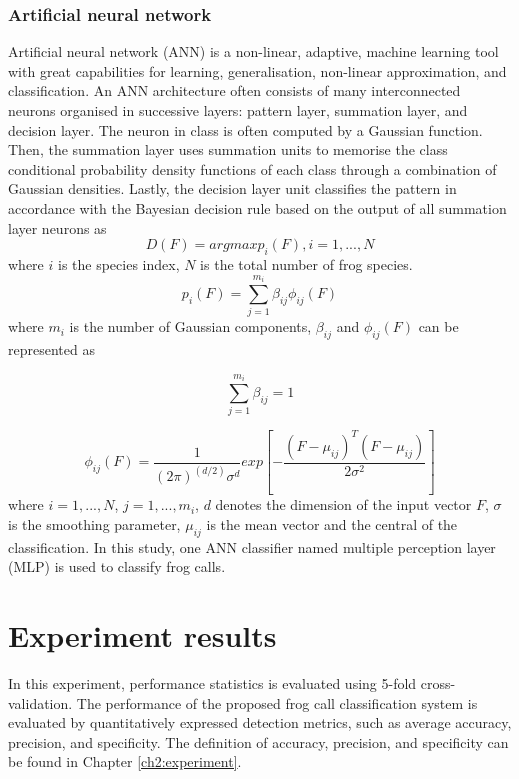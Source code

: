 \subsubsection{Artificial neural network}
Artificial neural network (ANN) is a non-linear, adaptive, machine learning tool with great capabilities for learning, generalisation, non-linear approximation, and classification. An ANN architecture often consists of many interconnected neurons organised in successive layers: pattern layer, summation layer, and decision layer. The neuron in class is often computed by a Gaussian function. Then, the summation layer uses summation units to memorise the class conditional probability density functions of each class through a combination of Gaussian densities. Lastly, the decision layer unit classifies the pattern in accordance with the Bayesian decision rule based on the output of all summation layer neurons as 
\begin{equation}
D(F)=argmax{p_{i}(F)}, i =1,...,N
\end{equation}
where $i$ is the species index, $N$ is the total number of frog species.
\begin{equation}
p_{i}(F)=\sum_{j=1}^{m_{i}}\beta_{ij}\phi_{ij}(F)
\end{equation}
where $m_{i}$ is the number of Gaussian components, $\beta_{ij}$ and $\phi_{ij}(F)$ can be represented as

\begin{equation}
\sum_{j=1}^{m_{i}}\beta_{ij}=1
\end{equation}

\begin{equation}
\phi_{ij}(F)=\frac{1}{(2\pi)^(d/2)\sigma^{d}}exp[-\frac{(F-\mu_{ij})^{T}(F-\mu_{ij})}{2\sigma^2}]
\end{equation}
where $i=1,...,N$, $j=1,...,m_{i}$, $d$ denotes the dimension of the input vector $F$, $\sigma$ is the smoothing parameter, $\mu_{ij}$ is the mean vector and the central of the classification. In this study, one ANN classifier named multiple perception layer (MLP) is used to classify frog calls.

\section{Experiment results}
In this experiment, performance statistics is evaluated using 5-fold cross-validation. The performance of the proposed frog call classification system is evaluated by quantitatively expressed detection metrics, such as average accuracy, precision, and specificity. The definition of accuracy, precision, and specificity can be found in Chapter \ref{ch2:experiment}.

